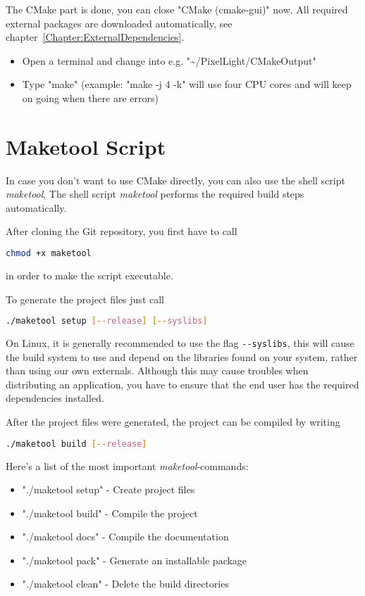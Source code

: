 The CMake part is done, you can close "CMake (cmake-gui)" now. All required external packages are downloaded automatically, see chapter~\ref{Chapter:ExternalDependencies}.
\begin{itemize}
\item{Open a terminal and change into e.g. "\textasciitilde /PixelLight/CMakeOutput"}
\item{Type "make" (example: "make -j 4 -k" will use four \ac{CPU} cores and will keep on going when there are errors)}
\end{itemize}




\section{Maketool Script}
\label{Chapter:Linux_Maketool}
In case you don't want to use CMake directly, you can also use the shell script \emph{maketool}, The shell script \emph{maketool} performs the required build steps automatically.

After cloning the Git repository, you first have to call
\begin{lstlisting}[language=sh]
chmod +x maketool
\end{lstlisting}
in order to make the script executable.

To generate the project files just call
\begin{lstlisting}[language=sh]
./maketool setup [--release] [--syslibs]
\end{lstlisting}

On Linux, it is generally recommended to use the flag \verb+--syslibs+, this will cause the build system to use and depend on the libraries found on your system, rather than using our own externals. Although this may cause troubles when distributing an application, you have to ensure that the end user has the required dependencies installed.

After the project files were generated, the project can be compiled by writing
\begin{lstlisting}[language=sh]
./maketool build [--release]
\end{lstlisting}

Here's a list of the most important \emph{maketool}-commands:
\begin{itemize}
\item{"./maketool setup"	- Create project files}
\item{"./maketool build"	- Compile the project}
\item{"./maketool docs"		- Compile the documentation}
\item{"./maketool pack"		- Generate an installable package}
\item{"./maketool clean"	- Delete the build directories}
\end{itemize}

